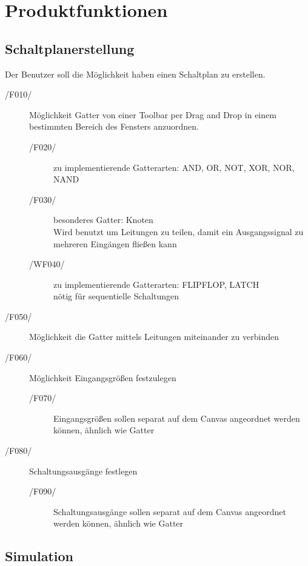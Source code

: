 
\section{Produktfunktionen}


\subsection{Schaltplanerstellung}

Der Benutzer soll die Möglichkeit haben einen Schaltplan zu erstellen.
\begin{description}
	\item[/F010/] Möglichkeit Gatter von einer Toolbar per Drag and Drop in einem bestimmten Bereich des Fensters anzuordnen.
	\begin{description}
		\item[/F020/] zu implementierende Gatterarten: AND, OR, NOT, XOR, NOR, NAND
		\item[/F030/] besonderes Gatter: Knoten\\
		Wird benutzt um Leitungen zu teilen, damit ein Ausgangssignal zu mehreren Eingängen fließen kann
		\item[/WF040/] zu implementierende Gatterarten: FLIPFLOP, LATCH\\
		nötig für sequentielle Schaltungen
	\end{description}
	\item[/F050/] Möglichkeit die Gatter mittels Leitungen miteinander zu verbinden
	\item[/F060/] Möglichkeit Eingangsgrößen festzulegen
	\begin{description}
		\item[/F070/] Eingangsgrößen sollen separat auf dem \gls{Canvas} angeordnet werden können, ähnlich wie Gatter
	\end{description}
	\item[/F080/] Schaltungsausgänge festlegen
	\begin{description}
		\item[/F090/] Schaltungsausgänge sollen separat auf dem \gls{Canvas} angeordnet werden können, ähnlich wie Gatter
	\end{description}
\end{description}

\subsection{Simulation}

